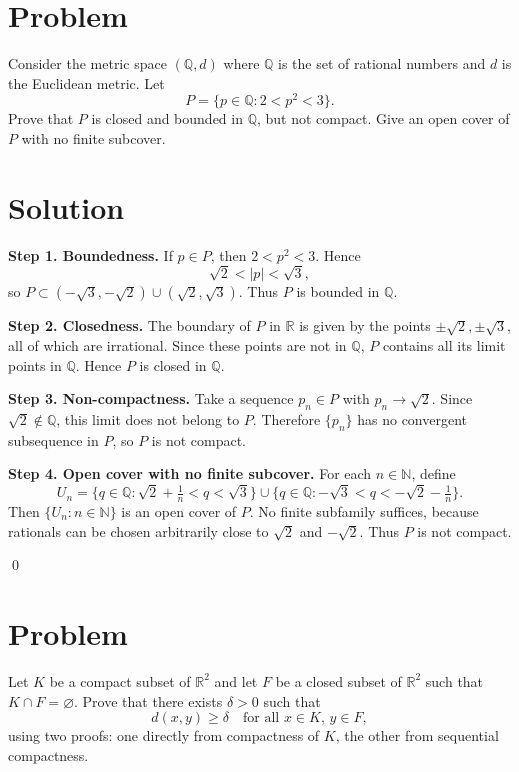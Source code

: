 \documentclass[11pt,a4paper]{article}
\theoremstyle{definition}
\theoremstyle{definition}
\theoremstyle{plain}
\theoremstyle{remark}
\begin{document}
\section*{Problem}
Consider the metric space $(\mathbb{Q}, d)$ where $\mathbb{Q}$ is the set of rational numbers and $d$ is the Euclidean metric. Let
\[
P = \{ p \in \mathbb{Q} : 2 < p^2 < 3 \}.
\]
Prove that $P$ is closed and bounded in $\mathbb{Q}$, but not compact. Give an open cover of $P$ with no finite subcover.

\section*{Solution}
\textbf{Step 1. Boundedness.}  
If $p \in P$, then $2 < p^2 < 3$. Hence
\[
\sqrt{2} < |p| < \sqrt{3},
\]
so $P \subset (-\sqrt{3}, -\sqrt{2}) \cup (\sqrt{2}, \sqrt{3})$.
Thus $P$ is bounded in $\mathbb{Q}$.

\medskip

\textbf{Step 2. Closedness.}  
The boundary of $P$ in $\mathbb{R}$ is given by the points $\pm \sqrt{2}, \pm \sqrt{3}$, all of which are irrational. Since these points are not in $\mathbb{Q}$, $P$ contains all its limit points in $\mathbb{Q}$. Hence $P$ is closed in $\mathbb{Q}$.

\medskip

\textbf{Step 3. Non-compactness.}  
Take a sequence $p_n \in P$ with $p_n \to \sqrt{2}$. Since $\sqrt{2}\notin \mathbb{Q}$, this limit does not belong to $P$. Therefore $\{p_n\}$ has no convergent subsequence in $P$, so $P$ is not compact.

\medskip

\textbf{Step 4. Open cover with no finite subcover.}  
For each $n\in \mathbb{N}$, define
\[
U_n = \{ q \in \mathbb{Q} : \sqrt{2} + \tfrac{1}{n} < q < \sqrt{3} \}
\cup
\{ q \in \mathbb{Q} : -\sqrt{3} < q < -\sqrt{2} - \tfrac{1}{n} \}.
\]
Then $\{U_n : n\in\mathbb{N}\}$ is an open cover of $P$.  
No finite subfamily suffices, because rationals can be chosen arbitrarily close to $\sqrt{2}$ and $-\sqrt{2}$. Thus $P$ is not compact.

\qed

\section*{Problem}
Let $K$ be a compact subset of $\mathbb{R}^2$ and let $F$ be a closed subset of $\mathbb{R}^2$ such that $K \cap F = \varnothing$. Prove that there exists $\delta > 0$ such that
\[
d(x,y) \geq \delta \quad \text{for all } x \in K, \, y \in F,
\]
using two proofs: one directly from compactness of $K$, the other from sequential compactness.
\end{document}

